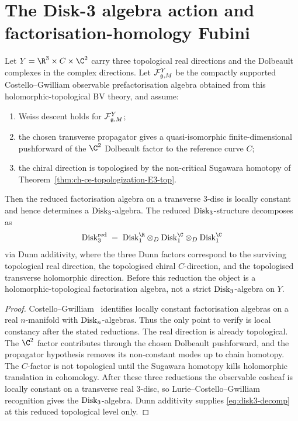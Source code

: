 \section{The Disk-3 algebra action and factorisation-homology Fubini}
\label{sec:ch-ce-disk3-fubini}

\begin{theorem}
\label{thm:ch-ce-disk3-algebra}
%
Let $Y=\R^3\times C\times\C^2$ carry three topological real
directions and the Dolbeault complexes in the complex directions. Let
$\mathcal{F}^Y_{\mathfrak{g},M}$ be the compactly supported Costello--Gwilliam
observable prefactorisation algebra obtained from this
holomorphic-topological BV theory, and assume:
\begin{enumerate}[label=\textup{(\roman*)}]
\item Weiss descent holds for $\mathcal{F}^Y_{\mathfrak{g},M}$;
\item the chosen transverse propagator gives a quasi-isomorphic
finite-dimensional pushforward of the $\C^2$ Dolbeault factor to the
reference curve $C$;
\item the chiral direction is topologised by the non-critical Sugawara
homotopy of Theorem~\ref{thm:ch-ce-topologization-E3-top}.
\end{enumerate}
Then the reduced factorisation algebra on a transverse $3$-disc is
locally constant and hence determines a $\mathrm{Disk}_3$-algebra. The reduced
$\mathrm{Disk}_3$-structure decomposes as
\begin{equation}
\label{eq:disk3-decomp}
\Disk_3^{\mathrm{red}}
\;=\;
\Disk_1^{\R}\otimes_D \Disk_1^{\C}\otimes_D \Disk_1^{\C}
\end{equation}
via Dunn additivity, where the three Dunn factors correspond to
the surviving topological real direction, the topologised chiral
$C$-direction, and the topologised transverse holomorphic direction.
Before this reduction the object is a holomorphic-topological
factorisation algebra, not a strict $\mathrm{Disk}_3$-algebra on $Y$.
\end{theorem}

\begin{proof}
Costello--Gwilliam~\cite[Thm.\,4.4.1]{CG17} identifies locally
constant factorisation algebras on a real $n$-manifold with
$\mathrm{Disk}_n$-algebras. Thus the only point to verify is local constancy
after the stated reductions. The real direction is already
topological. The $\C^2$ factor contributes through the chosen
Dolbeault pushforward, and the propagator hypothesis removes its
non-constant modes up to chain homotopy. The $C$-factor is
not topological until the Sugawara homotopy kills holomorphic
translation in cohomology. After these three reductions the observable
cosheaf is locally constant on a transverse real $3$-disc, so
Lurie--Costello--Gwilliam recognition gives the $\mathrm{Disk}_3$-algebra.
Dunn additivity supplies \eqref{eq:disk3-decomp} at this reduced
topological level only.
\end{proof}

